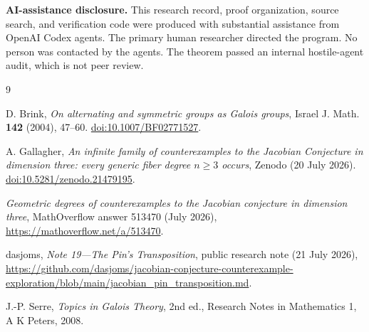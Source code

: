 \documentclass[11pt]{article}
\theoremstyle{remark}
\begin{document}
\medskip
\noindent\textbf{AI-assistance disclosure.}
This research record, proof organization, source search, and verification
code were produced with substantial assistance from OpenAI Codex agents.
The primary human researcher directed the program.  No person was contacted
by the agents.  The theorem passed an internal hostile-agent audit, which is
not peer review.

\begin{thebibliography}{9}

D. Brink,
\emph{On alternating and symmetric groups as Galois groups},
Israel J. Math. \textbf{142} (2004), 47--60.
\href{https://doi.org/10.1007/BF02771527}{doi:10.1007/BF02771527}.

A. Gallagher,
\emph{An infinite family of counterexamples to the Jacobian Conjecture in
dimension three: every generic fiber degree $n\ge3$ occurs},
Zenodo (20 July 2026).
\href{https://doi.org/10.5281/zenodo.21479195}{doi:10.5281/zenodo.21479195}.

\emph{Geometric degrees of counterexamples to the Jacobian conjecture in
dimension three}, MathOverflow answer 513470 (July 2026),
\url{https://mathoverflow.net/a/513470}.

dasjoms,
\emph{Note 19---The Pin's Transposition}, public research note
(21 July 2026),
\url{https://github.com/dasjoms/jacobian-conjecture-counterexample-exploration/blob/main/jacobian_pin_transposition.md}.

J.-P. Serre,
\emph{Topics in Galois Theory}, 2nd ed.,
Research Notes in Mathematics 1, A K Peters, 2008.

\end{thebibliography}
\end{document}
